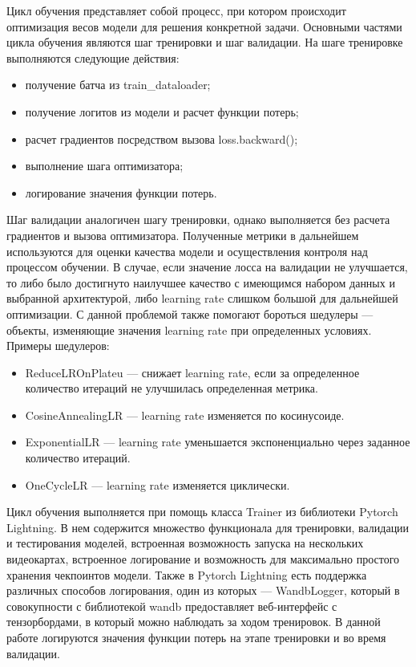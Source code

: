 Цикл обучения представляет собой процесс, при котором происходит оптимизация весов модели для решения конкретной задачи. Основными частями цикла обучения являются шаг тренировки и шаг валидации. На шаге тренировке выполняются следующие действия:

\begin{itemize}
	\item получение батча из train\_dataloader;
	\item получение логитов из модели и расчет функции потерь;
	\item расчет градиентов посредством вызова loss.backward();
	\item выполнение шага оптимизатора;
	\item логирование значения функции потерь.
\end{itemize}

Шаг валидации аналогичен шагу тренировки, однако выполняется без расчета градиентов и вызова оптимизатора. Полученные метрики в дальнейшем используются для оценки качества модели и осуществления контроля над процессом обучении. В случае, если значение лосса на валидации не улучшается, то либо было достигнуто наилучшее качество с имеющимся набором данных и выбранной архитектурой, либо learning rate слишком большой для дальнейшей оптимизации. С данной проблемой также помогают бороться шедулеры --- объекты, изменяющие значения learning rate при определенных условиях. Примеры шедулеров:

\begin{itemize}
	\item ReduceLROnPlateu --- снижает learning rate, если за определенное количество итераций не улучшилась определенная метрика.
	\item CosineAnnealingLR --- learning rate изменяется по косинусоиде.
	\item ExponentialLR --- learning rate уменьшается экспоненциально через заданное количество итераций.
	\item OneCycleLR --- learning rate изменяется циклически.
\end{itemize}

Цикл обучения выполняется при помощь класса Trainer из библиотеки Pytorch Lightning. В нем содержится множество функционала для тренировки, валидации и тестирования моделей, встроенная возможность запуска на нескольких видеокартах, встроенное логирование и возможность для максимально простого хранения чекпоинтов модели. Также в Pytorch Lightning есть поддержка различных способов логирования, один из которых --- WandbLogger, который в совокупности с библиотекой wandb предоставляет веб-интерфейс с тензорбордами, в который можно наблюдать за ходом тренировок. В данной работе логируются значения функции потерь на этапе тренировки и во время валидации.


